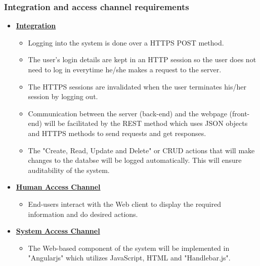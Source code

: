 \documentclass[a4paper,12pt]{article}
\begin{document}
\subsubsection{Integration and access channel requirements}
	\begin{itemize}
		\item{\bfseries \underline{Integration}}
		\begin{itemize}
           		\item Logging into the system is done over a HTTPS POST method.
			\item The user's login details are kept in an HTTP session so the user does not need to log in everytime he/she 					makes a request to the server.
			\item The HTTPS sessions are invalidated when the user terminates his/her session by logging out.
			\item Communication between the server (back-end) and the webpage (front-end) will be facilitated by the REST 					method which uses JSON objects and HTTPS methods to send requests and get responses.
			\item The "Create, Read, Update and Delete" or CRUD actions that will make changes to the databse will be 					logged automatically. This will ensure auditability of the system. 
		\end{itemize}

		\item{\bfseries \underline{Human Access Channel}}
			\begin{itemize}
				\item End-users interact with the Web client to display the required information and do desired actions. 
			\end{itemize}

		\item{\bfseries \underline{System Access Channel}}
			\begin{itemize}
				\item The Web-based component of the system will be implemented in "Angularjs" which utilizes JavaScript, 				HTML and "Handlebar.js".  
			\end{itemize}
	\end{itemize}

\end{document}
